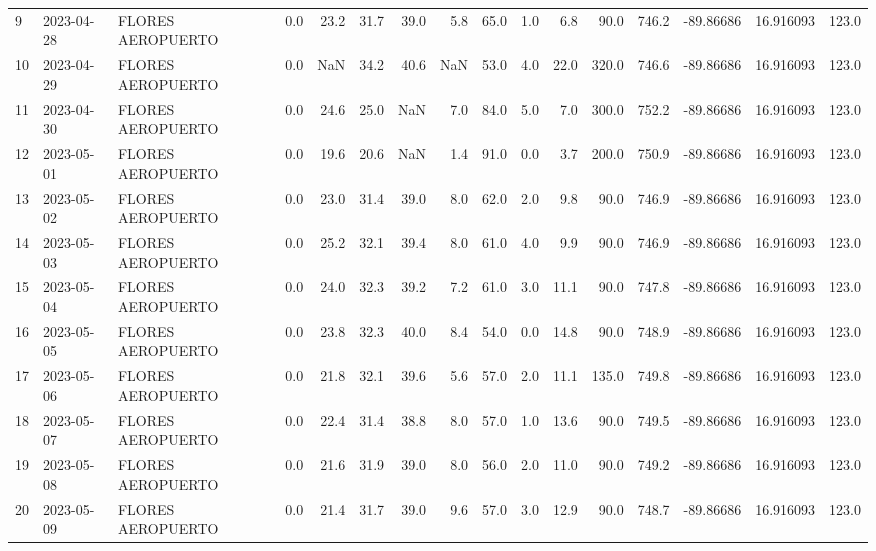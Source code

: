 \documentclass[12pt]{article}
\begin{document}
\begin{center}
\begin{tabular}{lllrrrrrrrrrrrrr}
9   & 2023-04-28 &  FLORES AEROPUERTO &     0.0 &  23.2 &   31.7 &  39.0 &      5.8 &     65.0 &  1.0 &         6.8 &        90.0 &      746.2 & -89.86686 &  16.916093 &    123.0 \\
10  & 2023-04-29 &  FLORES AEROPUERTO &     0.0 &   NaN &   34.2 &  40.6 &      NaN &     53.0 &  4.0 &        22.0 &       320.0 &      746.6 & -89.86686 &  16.916093 &    123.0 \\
11  & 2023-04-30 &  FLORES AEROPUERTO &     0.0 &  24.6 &   25.0 &   NaN &      7.0 &     84.0 &  5.0 &         7.0 &       300.0 &      752.2 & -89.86686 &  16.916093 &    123.0 \\
12  & 2023-05-01 &  FLORES AEROPUERTO &     0.0 &  19.6 &   20.6 &   NaN &      1.4 &     91.0 &  0.0 &         3.7 &       200.0 &      750.9 & -89.86686 &  16.916093 &    123.0 \\
13  & 2023-05-02 &  FLORES AEROPUERTO &     0.0 &  23.0 &   31.4 &  39.0 &      8.0 &     62.0 &  2.0 &         9.8 &        90.0 &      746.9 & -89.86686 &  16.916093 &    123.0 \\
14  & 2023-05-03 &  FLORES AEROPUERTO &     0.0 &  25.2 &   32.1 &  39.4 &      8.0 &     61.0 &  4.0 &         9.9 &        90.0 &      746.9 & -89.86686 &  16.916093 &    123.0 \\
15  & 2023-05-04 &  FLORES AEROPUERTO &     0.0 &  24.0 &   32.3 &  39.2 &      7.2 &     61.0 &  3.0 &        11.1 &        90.0 &      747.8 & -89.86686 &  16.916093 &    123.0 \\
16  & 2023-05-05 &  FLORES AEROPUERTO &     0.0 &  23.8 &   32.3 &  40.0 &      8.4 &     54.0 &  0.0 &        14.8 &        90.0 &      748.9 & -89.86686 &  16.916093 &    123.0 \\
17  & 2023-05-06 &  FLORES AEROPUERTO &     0.0 &  21.8 &   32.1 &  39.6 &      5.6 &     57.0 &  2.0 &        11.1 &       135.0 &      749.8 & -89.86686 &  16.916093 &    123.0 \\
18  & 2023-05-07 &  FLORES AEROPUERTO &     0.0 &  22.4 &   31.4 &  38.8 &      8.0 &     57.0 &  1.0 &        13.6 &        90.0 &      749.5 & -89.86686 &  16.916093 &    123.0 \\
19  & 2023-05-08 &  FLORES AEROPUERTO &     0.0 &  21.6 &   31.9 &  39.0 &      8.0 &     56.0 &  2.0 &        11.0 &        90.0 &      749.2 & -89.86686 &  16.916093 &    123.0 \\
20  & 2023-05-09 &  FLORES AEROPUERTO &     0.0 &  21.4 &   31.7 &  39.0 &      9.6 &     57.0 &  3.0 &        12.9 &        90.0 &      748.7 & -89.86686 &  16.916093 &    123.0 \\

\end{tabular}
\end{center}
\end{document}
